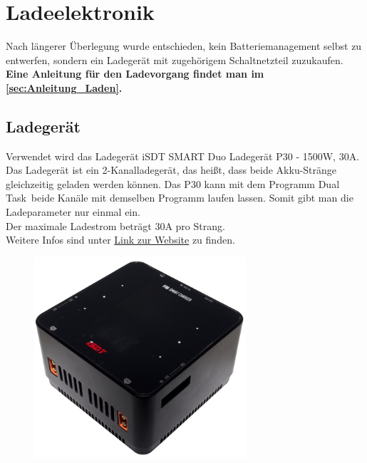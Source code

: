 \section{Ladeelektronik}
Nach längerer Überlegung wurde entschieden, kein Batteriemanagement selbst zu entwerfen, sondern ein Ladegerät mit zugehörigem Schaltnetzteil zuzukaufen. \\

\textbf{Eine Anleitung für den Ladevorgang findet man im \autoref{sec:Anleitung_Laden}.}


\subsection{Ladegerät}
Verwendet wird das Ladegerät \glqq iSDT SMART Duo Ladegerät P30 - 1500W, 30A\grqq. Das Ladegerät ist ein 2-Kanalladegerät, das heißt, 
dass beide Akku-Stränge gleichzeitig geladen werden können. 
Das P30 kann mit dem Programm \glqq Dual Task\grqq\ beide Kanäle mit demselben Programm laufen lassen. Somit gibt man die Ladeparameter nur einmal ein. \\
Der maximale Ladestrom beträgt 30$\mathrm{A}$ pro Strang. \\
Weitere Infos sind unter \href{https://www.modell-hubschrauber.at/Ladegeraete-Netzteile-Ladekabel-und-Zubehoer/Ladegeraete/Ladegeraete-12Volt/iSDT-SMART-Dup-Ladegeraet-P30-1500W-30A-8S-Lipo::43075.html}{Link zur Website} 
zu finden. 

\begin{figure}[H]
    \centering
    \includegraphics[width=0.7\textwidth]{Fotos/SP30_DSC_8784.png}
\end{figure}

